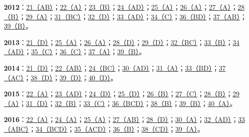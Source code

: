 \documentclass[11pt,a4paper]{article}
\begin{document}
\noindent\textbf{2012}：\hyperref[idx-2012-T1-Q21]{21（AB）}；\hyperref[idx-2012-T1-Q22]{22（A）}；\hyperref[idx-2012-T1-Q23]{23（B）}；\hyperref[idx-2012-T1-Q24]{24（AD）}；\hyperref[idx-2012-T1-Q25]{25（A）}；\hyperref[idx-2012-T2-Q26]{26（A）}；\hyperref[idx-2012-T2-Q27]{27（A）}；\hyperref[idx-2012-T2-Q28]{28（B）}；\hyperref[idx-2012-T2-Q29]{29（A）}；\hyperref[idx-2012-T3-Q31]{31（BC）}；\hyperref[idx-2012-T3-Q32]{32（D）}；\hyperref[idx-2012-T3-Q33]{33（AD）}；\hyperref[idx-2012-T3-Q34]{34（C）}；\hyperref[idx-2012-T4-Q36]{36（BD）}；\hyperref[idx-2012-T4-Q37]{37（AB）}；\hyperref[idx-2012-T4-Q39]{39（B）}。\par
\noindent\textbf{2013}：\hyperref[idx-2013-T1-Q21]{21（D）}；\hyperref[idx-2013-T1-Q25]{25（A）}；\hyperref[idx-2013-T2-Q26]{26（A）}；\hyperref[idx-2013-T2-Q28]{28（D）}；\hyperref[idx-2013-T2-Q29]{29（D）}；\hyperref[idx-2013-T3-Q32]{32（BC）}；\hyperref[idx-2013-T3-Q33]{33（B）}；\hyperref[idx-2013-T3-Q34]{34（AD）}；\hyperref[idx-2013-T3-Q35]{35（C）}；\hyperref[idx-2013-T4-Q36]{36（C）}；\hyperref[idx-2013-T4-Q37]{37（A）}；\hyperref[idx-2013-T4-Q39]{39（B）}。\par
\noindent\textbf{2014}：\hyperref[idx-2014-T1-Q21]{21（D）}；\hyperref[idx-2014-T1-Q22]{22（AB）}；\hyperref[idx-2014-T1-Q24]{24（BC）}；\hyperref[idx-2014-T2-Q30]{30（AD）}；\hyperref[idx-2014-T3-Q31]{31（A）}；\hyperref[idx-2014-T3-Q33]{33（BD）}；\hyperref[idx-2014-T4-Q37]{37（AC）}；\hyperref[idx-2014-T4-Q38]{38（D）}；\hyperref[idx-2014-T4-Q39]{39（D）}；\hyperref[idx-2014-T4-Q40]{40（D）}。\par
\noindent\textbf{2015}：\hyperref[idx-2015-T1-Q22]{22（A）}；\hyperref[idx-2015-T1-Q23]{23（AD）}；\hyperref[idx-2015-T1-Q24]{24（D）}；\hyperref[idx-2015-T1-Q25]{25（D）}；\hyperref[idx-2015-T2-Q26]{26（B）}；\hyperref[idx-2015-T2-Q27]{27（C）}；\hyperref[idx-2015-T2-Q28]{28（B）}；\hyperref[idx-2015-T2-Q29]{29（A）}；\hyperref[idx-2015-T3-Q31]{31（D）}；\hyperref[idx-2015-T3-Q32]{32（B）}；\hyperref[idx-2015-T3-Q33]{33（C）}；\hyperref[idx-2015-T4-Q36]{36（BCD）}；\hyperref[idx-2015-T4-Q38]{38（B）}；\hyperref[idx-2015-T4-Q39]{39（B）}；\hyperref[idx-2015-T4-Q40]{40（A）}。\par
\noindent\textbf{2016}：\hyperref[idx-2016-T1-Q22]{22（A）}；\hyperref[idx-2016-T1-Q24]{24（A）}；\hyperref[idx-2016-T1-Q25]{25（A）}；\hyperref[idx-2016-T2-Q27]{27（AB）}；\hyperref[idx-2016-T2-Q28]{28（D）}；\hyperref[idx-2016-T2-Q30]{30（A）}；\hyperref[idx-2016-T3-Q32]{32（AD）}；\hyperref[idx-2016-T3-Q33]{33（ABC）}；\hyperref[idx-2016-T3-Q34]{34（BCD）}；\hyperref[idx-2016-T3-Q35]{35（ACD）}；\hyperref[idx-2016-T4-Q36]{36（B）}；\hyperref[idx-2016-T4-Q38]{38（CD）}；\hyperref[idx-2016-T4-Q39]{39（A）}。\par
{}
\end{document}
